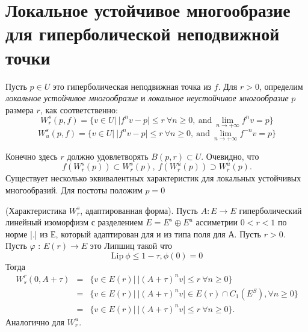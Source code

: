 \section{Локальное устойчивое многообразие для гиперболической неподвижной точки}

Пусть $p \in U$ это гиперболическая неподвижная точка из $f$. Для $r > 0$, определим \textit{локальное устойчивое многообразие} и \textit{локальное неустойчивое многообразие} $p$ размера $r$, как соответственно:
$$
W_r^s(p,f)=\{v \in U | \ | f^nv-p| \leqslant r \ \forall n \geqslant 0, \ \textrm{and} \ \lim\limits_{n \to +\infty} {f^nv=p}\}
$$
$$
W_u^s(p,f)=\{v \in U | \ | f^nv-p| \leqslant r \ \forall n \geqslant 0, \ \textrm{and} \ \lim\limits_{n \to +\infty} {f^{-n}v=p}\}
$$

Конечно здесь $r$ должно удовлетворять $B(p,r) \subset U$. Очевидно, что
$$
f(W^s_r(p)) \subset W^s_r(p), \ f(W^u_r(p)) \supset W^u_r(p).
$$
Существует несколько эквивалентных характеристик для локальных устойчивых многообразий. Для постоты положим $p=0$ 
\begin{lemma}
\label{lemma2_14}
(Характеристика $W^s_r$, адаптированная форма). Пусть $A: E \rightarrow E$ гиперболический линейный изоморфизм с разделением $E = E^s \oplus E^u$ ассиметрии $0 < r < 1$  по норме |.| из $Е$, который адаптирован для и из типа поля для $А$. Пусть $r > 0$. Пусть $\varphi$ : $E(r) \rightarrow E$ это Липшиц такой что
$$
\mathrm{Lip } \ \phi \leqslant 1 - \tau, \phi(0)=0
$$
Тогда 
$$
\begin{array}{rclll}
W_s^r(0, A + \tau) & = & \{v \in E(r) | \ | (A + \tau)^n v | \leq r \ \forall n \geq 0\} \\
                   & = & \{v \in E(r) | \ | (A + \tau)^n v | \in E(r) \cap C_1(E^S),  \forall n \geq 0\} \\
                   & = & \{v \in E(r) | \ | (A + \tau)^n v | \leq r \ \forall n \geq 0\}.
\end{array} 
$$
Аналогично для $W_r^u$.
\end{lemma}

